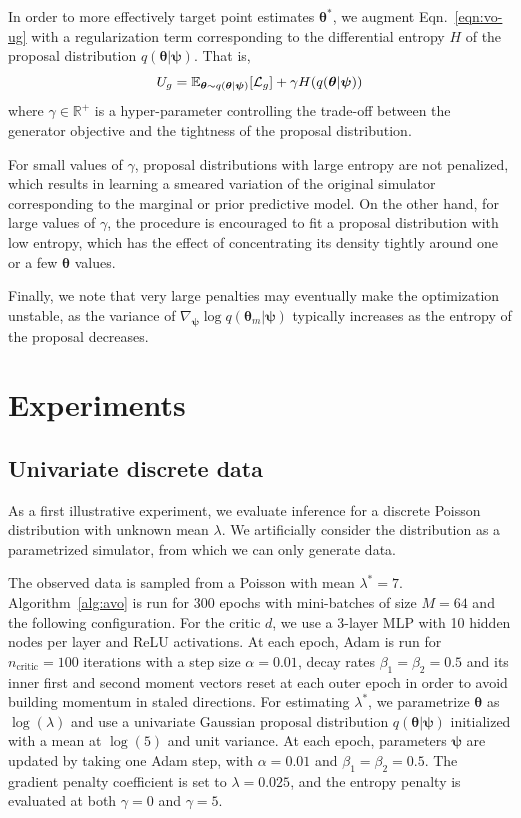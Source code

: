 \documentclass[twocolumn,superscriptaddress,aps]{revtex4-1}
\newcommand{\bftheta}{{\bm \theta}}
\newcommand{\bfpsi}{{\bm \psi}}
\theoremstyle{plain}
\begin{document}
In order to more effectively target
point estimates $\bftheta^*$, we augment Eqn.~\ref{eqn:vo-ug} with a
regularization term corresponding to the differential entropy $H$ of the
proposal distribution $q(\bftheta | \bfpsi)$. That is,
\begin{equation}
    U_g = \mathbb{E}_{\bftheta \sim q(\bftheta|\bfpsi)} [ {\cal L}_g ] + \gamma H(q(\bftheta|\bfpsi))
\end{equation}
where $\gamma \in \mathbb{R}^+$ is a hyper-parameter controlling the trade-off
between the generator objective and the tightness of the proposal distribution.

For small values of $\gamma$,
proposal distributions with large entropy are not penalized, which results
in learning a smeared variation of the original simulator corresponding to the marginal or prior predictive model. On the other hand,
for large values of $\gamma$, the procedure is encouraged to fit a proposal
distribution with low entropy, which has the effect of concentrating its density
tightly around one or a few $\bftheta$ values.

Finally, we note that very large penalties may
eventually make the optimization unstable, as the variance of $\nabla_\bfpsi \log q(\bftheta_m|\bfpsi)$
typically increases as the entropy of the proposal decreases.



\section{Experiments}

\subsection{Univariate discrete data}

As a first illustrative experiment, we evaluate inference for a discrete Poisson
distribution with unknown mean $\lambda$. We artificially consider
the distribution as a parametrized simulator, from which we can only
generate data.

The observed data is sampled from a Poisson with mean $\lambda^* = 7$.
Algorithm~\ref{alg:avo} is run for 300 epochs with mini-batches of size $M=64$
and the following configuration. For the critic $d$, we use a 3-layer MLP with 10
hidden nodes per layer and ReLU activations. At each epoch, Adam is run for
$n_\text{critic}=100$ iterations with a step size $\alpha=0.01$, decay rates
$\beta_1=\beta_2=0.5$ and its inner first and second moment vectors reset at
each outer epoch in order to avoid building momentum in staled directions.  For
estimating $\lambda^*$, we parametrize $\bftheta$ as $\log(\lambda)$ and use a univariate Gaussian proposal distribution
$q(\bftheta|\bfpsi)$ initialized with a mean at $\log(5)$ and unit variance. At
each epoch, parameters $\bfpsi$ are updated by taking one Adam step, with
$\alpha=0.01$ and $\beta_1=\beta_2=0.5$. The gradient penalty coefficient is set to
$\lambda=0.025$, and the entropy penalty is evaluated at both $\gamma=0$ and $\gamma=5$.
\end{document}
